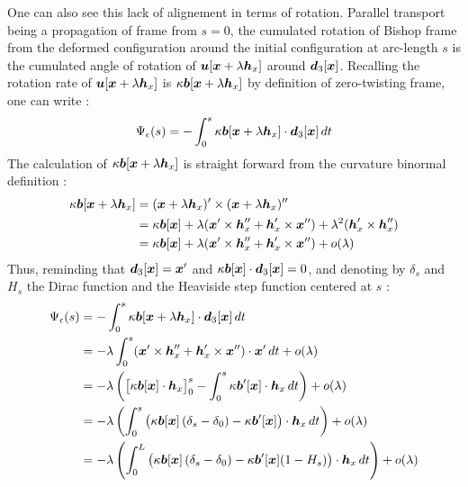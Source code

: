 One can also see this lack of alignement in terms of rotation. Parallel transport being a propagation of frame from $s = 0$, the cumulated rotation of Bishop frame from the deformed configuration around the initial configuration at arc-length $s$ is the cumulated angle of rotation of $\boldsymbol{u}[\boldsymbol{x} + \lambda\boldsymbol{h}_x]$ around $\boldsymbol{d}_3[\boldsymbol{x}]$. Recalling the rotation rate of $\boldsymbol{u}[\boldsymbol{x} + \lambda\boldsymbol{h}_x]$ is $\kappa\boldsymbol{b}[\boldsymbol{x} + \lambda\boldsymbol{h}_x]$ by definition of zero-twisting frame, one can write :
\begin{equation}
	\Psi_\epsilon(s) =
	-\int_0^s \kappa\boldsymbol{b}[\boldsymbol{x} + \lambda\boldsymbol{h}_x] \cdot \boldsymbol{d}_3[\boldsymbol{x}] \,dt
\end{equation}
The calculation of $\kappa\boldsymbol{b}[\boldsymbol{x} + \lambda\boldsymbol{h}_x]$ is straight forward from the curvature binormal definition :
\begin{equation}
	\begin{aligned}
	\kappa\boldsymbol{b}[\boldsymbol{x} + \lambda\boldsymbol{h}_x]
	&= (\boldsymbol{x} + \lambda\boldsymbol{h}_x)' \times (\boldsymbol{x} + \lambda\boldsymbol{h}_x)'' \\
	&= \kappa\boldsymbol{b}[\boldsymbol{x}] + \lambda(\boldsymbol{x}'\times\boldsymbol{h}''_x + \boldsymbol{h}'_x\times\boldsymbol{x}'') + \lambda^2(\boldsymbol{h}'_x \times \boldsymbol{h}''_x) \\
	&= \kappa\boldsymbol{b}[\boldsymbol{x}] + \lambda(\boldsymbol{x}'\times\boldsymbol{h}''_x + \boldsymbol{h}'_x\times\boldsymbol{x}'') + o(\lambda)
	\end{aligned}
\end{equation}
Thus, reminding that $\boldsymbol{d}_3[\boldsymbol{x}] = \boldsymbol{x}'$ and $\kappa\boldsymbol{b}[\boldsymbol{x}]\cdot\boldsymbol{d}_3[\boldsymbol{x}] = 0$, and denoting by $\delta_s$ and $H_s$ the Dirac function and the Heaviside step function centered at $s$ :
\begin{equation}
	\begin{aligned}
		\Psi_\epsilon(s) 
		&= -\int_0^s \kappa\boldsymbol{b}[\boldsymbol{x} + \lambda\boldsymbol{h}_x] \cdot \boldsymbol{d}_3[\boldsymbol{x}] \,dt\\
		&= - \lambda \int_0^s (\boldsymbol{x}'\times\boldsymbol{h}''_x + \boldsymbol{h}'_x\times\boldsymbol{x}'') \cdot \boldsymbol{x}' \,dt + o(\lambda)\\
		&=  - \lambda \left(\big[\kappa\boldsymbol{b}[\boldsymbol{x}] \cdot  \boldsymbol{h}_x \big]_0^s - \int_0^s \kappa\boldsymbol{b}'[\boldsymbol{x}] \cdot  \boldsymbol{h}_x \,dt\right) + o(\lambda)\\
		&= - \lambda \left(\int_0^s \left(\kappa\boldsymbol{b}[\boldsymbol{x}]\left(\delta_s-\delta_0\right) - \kappa\boldsymbol{b}'[\boldsymbol{x}]\right)\cdot  \boldsymbol{h}_x \,dt\right) + o(\lambda)\\
		&= - \lambda \left(\int_0^L \left(\kappa\boldsymbol{b}[\boldsymbol{x}]\left(\delta_s-\delta_0\right) - \kappa\boldsymbol{b}'[\boldsymbol{x}](1-H_s)\right)\cdot  \boldsymbol{h}_x \,dt\right) + o(\lambda)
	\end{aligned}
\end{equation}

